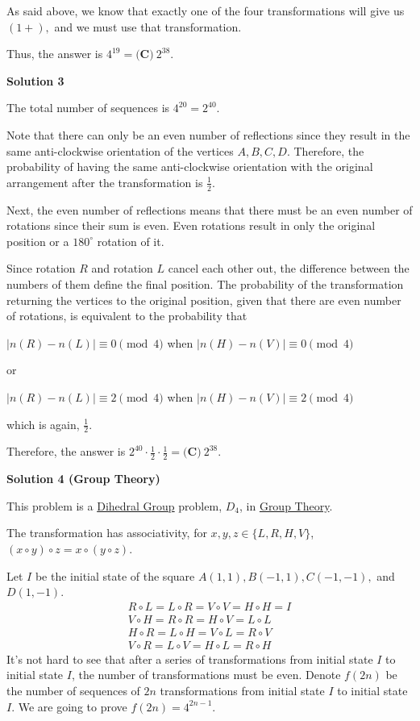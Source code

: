 \begin{enumerate}
 As said above, we know that exactly one of the four transformations will give us $(1+),$ and we must use that transformation.

 Thus, the answer is $4^{19}=\boxed{\textbf{(C)}\ 2^{38}}.$




\textbf{Solution 3}

The total number of sequences is $4^{20}=2^{40}.$

 Note that there can only be an even number of reflections since they result in the same anti-clockwise orientation of the vertices $A,B,C,D.$ Therefore, the probability of having the same anti-clockwise orientation with the original arrangement after the transformation is $\frac{1}{2}.$

 Next, the even number of reflections means that there must be an even number of rotations since their sum is even. Even rotations result in only the original position or a $180^{\circ}$ rotation of it. 

 Since rotation $R$ and rotation $L$ cancel each other out, the difference between the numbers of them define the final position. The probability of the transformation returning the vertices to the original position, given that there are even number of rotations, is equivalent to the probability that

 $|n(R)-n(L)|\equiv0\pmod{4}$ when $|n(H)-n(V)|\equiv0\pmod{4}$

 or

 $|n(R)-n(L)|\equiv2\pmod{4}$ when $|n(H)-n(V)|\equiv2\pmod{4}$

 which is again, $\frac{1}{2}.$

 Therefore, the answer is $2^{40}\cdot\frac{1}{2}\cdot\frac{1}{2}=\boxed{\textbf{(C)}\ 2^{38}}.$




\textbf{Solution 4 (Group Theory)}

This problem is a \href{https://en.wikipedia.org/wiki/Dihedral\_group}{Dihedral Group} problem, $D_4$, in \href{https://en.wikipedia.org/wiki/Group\_theory}{Group Theory}.

 The transformation has associativity, for $x, y, z \in 	\{ L, R, H, V \}$, $(x \circ y) \circ z = x \circ (y \circ z)$.

 Let $I$ be the initial state of the square $A(1,1), B(-1,1), C(-1,-1),$ and $D(1,-1)$.
 \begin{align} R \circ L = L \circ R = V \circ V = H \circ H = I\\ V \circ H = R \circ R = H \circ V = L \circ L\\ H \circ R = L \circ H = V \circ L = R \circ V\\ V \circ R = L \circ V = H \circ L = R \circ H \end{align}It's not hard to see that after a series of transformations from initial state $I$ to initial state $I$, the number of transformations must be even. Denote $f(2n)$ be the number of sequences of $2n$ transformations from initial state $I$ to initial state $I$. We are going to prove $f(2n) = 4^{2n-1}$.


\end{enumerate}
